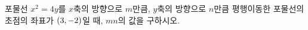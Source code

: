 포물선 $x^2=4y$를 $x$축의 방향으로 $m$만큼, $y$축의 방향으로 $n$만큼 평행이동한 포물선의 초점의 좌표가 $(3{,}\mkern3mu\mathopen{}-2)$일 때, $mn$의 값을 구하시오.
